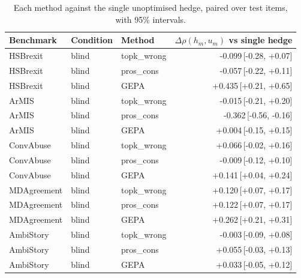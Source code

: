 \begin{table}[t]
\centering
\small
\begin{tabular}{lllr}
\hline
Benchmark & Condition & Method & $\Delta\rho(h_m,u_m)$ vs single hedge \\
\hline
HSBrexit & blind & topk\_wrong & -0.099{\scriptsize\,[-0.28, +0.07]} \\
HSBrexit & blind & pros\_cons & -0.057{\scriptsize\,[-0.22, +0.11]} \\
HSBrexit & blind & GEPA & +0.435{\scriptsize\,[+0.21, +0.65]} \\
ArMIS & blind & topk\_wrong & -0.015{\scriptsize\,[-0.21, +0.20]} \\
ArMIS & blind & pros\_cons & -0.362{\scriptsize\,[-0.56, -0.16]} \\
ArMIS & blind & GEPA & +0.004{\scriptsize\,[-0.15, +0.15]} \\
ConvAbuse & blind & topk\_wrong & +0.066{\scriptsize\,[-0.02, +0.16]} \\
ConvAbuse & blind & pros\_cons & -0.009{\scriptsize\,[-0.12, +0.10]} \\
ConvAbuse & blind & GEPA & +0.141{\scriptsize\,[+0.04, +0.24]} \\
MDAgreement & blind & topk\_wrong & +0.120{\scriptsize\,[+0.07, +0.17]} \\
MDAgreement & blind & pros\_cons & +0.122{\scriptsize\,[+0.07, +0.17]} \\
MDAgreement & blind & GEPA & +0.262{\scriptsize\,[+0.21, +0.31]} \\
AmbiStory & blind & topk\_wrong & -0.003{\scriptsize\,[-0.09, +0.08]} \\
AmbiStory & blind & pros\_cons & +0.055{\scriptsize\,[-0.03, +0.13]} \\
AmbiStory & blind & GEPA & +0.033{\scriptsize\,[-0.05, +0.12]} \\
\hline
\end{tabular}
\caption{Each method against the single unoptimised hedge, paired over test items, with 95\% intervals.}
\label{tab:paired-methods}
\end{table}